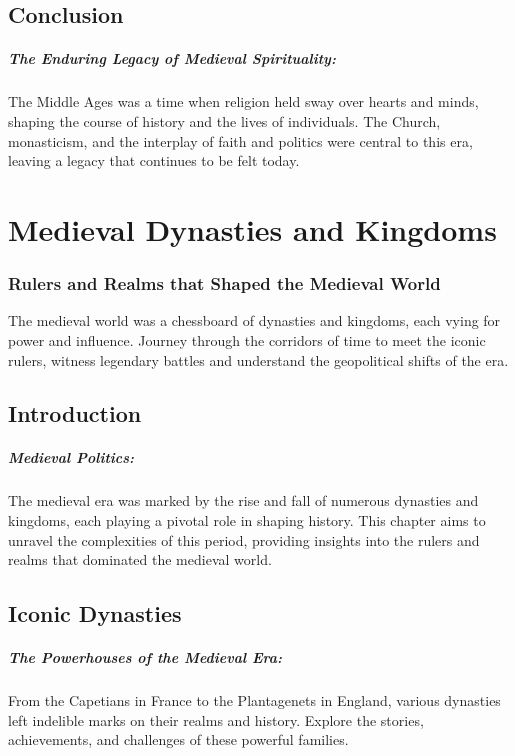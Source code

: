 \documentclass[a4paper,12pt]{book}
\begin{document}
\section*{Conclusion}

\paragraph{The Enduring Legacy of Medieval Spirituality:}
The Middle Ages was a time when religion held sway over hearts and minds, shaping the course of history and the lives of individuals. The Church, monasticism, and the interplay of faith and politics were central to this era, leaving a legacy that continues to be felt today.

\chapter{Medieval Dynasties and Kingdoms}
\subsection*{Rulers and Realms that Shaped the Medieval World}
The medieval world was a chessboard of dynasties and kingdoms, each vying for power and influence. Journey through the corridors of time to meet the iconic rulers, witness legendary battles and understand the geopolitical shifts of the era.

\section*{Introduction}

\paragraph{Medieval Politics:}
The medieval era was marked by the rise and fall of numerous dynasties and kingdoms, each playing a pivotal role in shaping history. This chapter aims to unravel the complexities of this period, providing insights into the rulers and realms that dominated the medieval world.

\section*{Iconic Dynasties}

\paragraph{The Powerhouses of the Medieval Era:}
From the Capetians in France to the Plantagenets in England, various dynasties left indelible marks on their realms and history. Explore the stories, achievements, and challenges of these powerful families.
\end{document}
